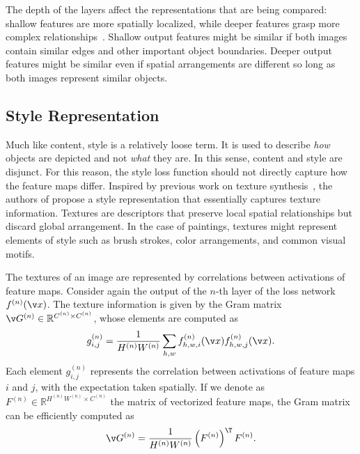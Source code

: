 The depth of the layers affect the representations that are being compared: shallow features are more spatially localized, while deeper features grasp more complex relationships~\cite{mahendran2015understanding, yosinski2015understanding, simonyan2014deep,zeiler2014visualizing, springenberg2014striving}. Shallow output features might be similar if both images contain similar edges and other important object boundaries. Deeper output features might be similar even if spatial arrangements are different so long as both images represent similar objects.

\subsection{Style Representation}\label{sec:style}
Much like content, style is a relatively loose term. It is used to describe \textit{how} objects are depicted and not \textit{what} they are. In this sense, content and style are disjunct. For this reason, the style loss function should not directly capture how the feature maps differ. Inspired by previous work on texture synthesis~\cite{gatys2015texture,portilla2000parametric}, the authors of \cite{gatys2016image} propose a style representation that essentially captures texture information. Textures are descriptors that preserve local spatial relationships but discard global arrangement. In the case of paintings, textures might represent elements of style such as brush strokes, color arrangements, and common visual motifs.

The textures of an image are represented by correlations between activations of feature maps. Consider again the output of the $n$-th layer of the loss network $f^{(n)}(\v x)$. The texture information is given by the Gram matrix $\v G^{(n)}\in \mathbb{R}^{C^{(n)}\times C^{(n)}}$, whose elements are computed as
\begin{equation}
g^{(n)}_{i,j} = \frac{1}{H^{(n)}W^{(n)}}\sum_{h,w}f_{h,w,i}^{(n)}(\v x)f_{h,w,j}^{(n)}(\v x).
\end{equation}
Each element $g^{(n)}_{i,j}$ represents the correlation between activations of feature maps $i$ and $j$, with the expectation taken spatially. If we denote as $F^{(n)} \in \mathbb{R}^{H^{(n)}W^{(n)}\times C^{(n)}}$ the matrix of vectorized feature maps, the Gram matrix can be efficiently computed as
\begin{equation}
\v G^{(n)} = \frac{1}{H^{(n)} W^{(n)}}\left(F^{(n)}\right)^\T F^{(n)}.
\end{equation}

